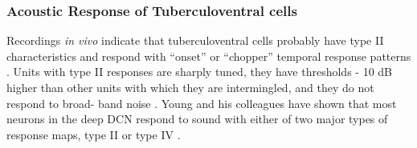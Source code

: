 


\subsubsection{Acoustic Response of Tuberculoventral cells}


 Recordings \textit{in vivo} indicate that tuberculoventral cells probably have type II characteristics
 and respond with “onset” or “chopper”
 temporal response patterns \citep{ZhangOertel:1993b}. Units with type II responses are sharply tuned, they
 have thresholds - 10 dB higher than other units with which
 they are intermingled, and they do not respond to broad-
 band noise \citep{SpirouDavisEtAl:1999,YoungBrownell:1976,Young:1980,SachsYoung:1980,YoungVoigt:1982,ShofnerYoung:1985,VoigtYoung:1990,YoungSpirouEtAl:1992,Rhode:1999}. Young and his colleagues have
 shown that most neurons in the deep DCN respond to
 sound with either of two major types of response maps, type
 II or type IV 
\citep{EvansNelson:1973,ShofnerYoung:1985,VoigtYoung:1980,VoigtYoung:1990,Young:1980,YoungBrownell:1976}. 

